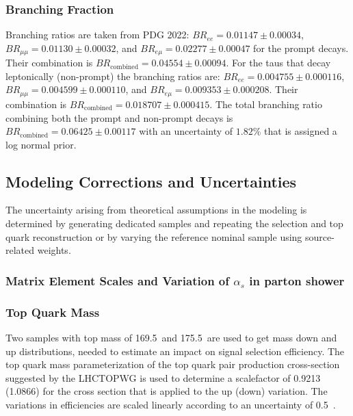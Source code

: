 \subsubsection{Branching Fraction}
\label{sec:bf}
Branching ratios are taken from PDG 2022: $BR_{ee} = 0.01147\pm0.00034$, $BR_{\mu\mu} = 0.01130 \pm 0.00032$, and $BR_{e\mu} = 0.02277 \pm 0.00047$ for the prompt decays. Their combination is $BR_{\mathrm{combined}} = 0.04554 \pm 0.00094$. For the taus that decay leptonically (non-prompt) the branching ratios are: $BR_{ee} = 0.004755\pm0.000116$, $BR_{\mu\mu} = 0.004599 \pm 0.000110$, and $BR_{e\mu} = 0.009353 \pm 0.000208$. Their combination is $BR_{\mathrm{combined}} = 0.018707 \pm 0.000415$. The total branching ratio combining both the prompt and non-prompt decays is $BR_{\mathrm{combined}} = 0.06425 \pm 0.00117$ with an uncertainty of $1.82\%$ that is assigned a log normal prior.

\subsection{Modeling Corrections and Uncertainties}
The uncertainty arising from theoretical assumptions in the modeling is determined by generating dedicated samples and repeating the selection and top quark reconstruction or by varying the reference nominal sample using source-related weights.

\subsubsection{Matrix Element Scales and Variation of $\alpha_s$ in parton shower}
\label{sec:MEscales}

\subsubsection{Top Quark Mass }
\label{sec:TopMass}
Two samples with top mass of 169.5~\GeV and 175.5~\GeV are used to get mass down and up distributions, needed to estimate an impact on signal selection efficiency. The top quark mass parameterization of the top quark pair production cross-section suggested by the LHCTOPWG is used to determine a scalefactor of 0.9213 (1.0866) for the \ttbar cross section that is applied to the up (down) variation. The variations in efficiencies are scaled linearly according to an uncertainty of 0.5~\GeV.

